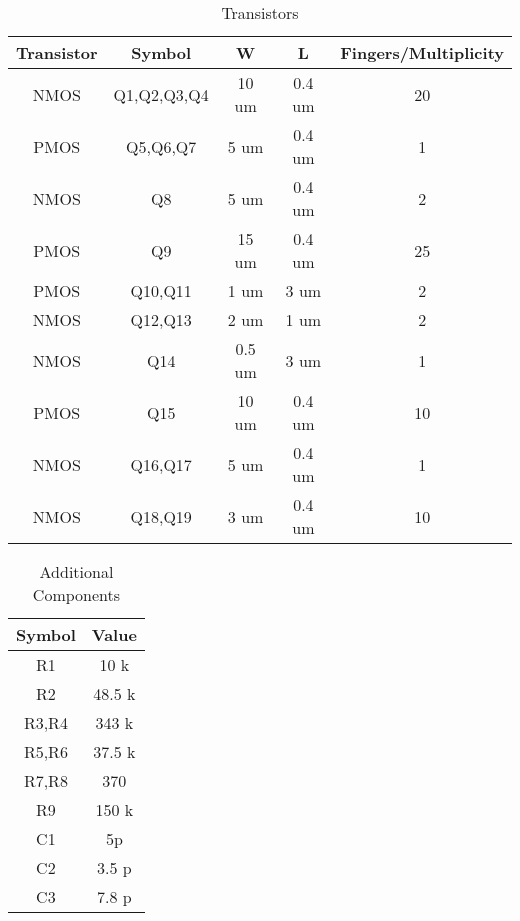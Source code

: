 \begin{table}[h]
\centering
\caption{Transistors}
\label{trans_specs}
\begin{tabular}{c|c|c|c|c}
\textbf{Transistor}  & \textbf{Symbol}& \textbf{W}  & \textbf{L}  & \textbf{Fingers/Multiplicity}  \\ \hline
NMOS                 & Q1,Q2,Q3,Q4    & 10 um       & 0.4 um      & 20                \\
PMOS                 & Q5,Q6,Q7       & 5 um        & 0.4 um      & 1                 \\
NMOS                 & Q8             & 5 um        & 0.4 um      & 2                 \\
PMOS                 & Q9             & 15 um       & 0.4 um      & 25                \\
PMOS                 & Q10,Q11        & 1 um        & 3 um        & 2                 \\
NMOS                 & Q12,Q13        & 2 um        & 1 um        & 2                 \\
NMOS                 & Q14            & 0.5 um      & 3 um        & 1                 \\
PMOS                 & Q15            & 10 um       & 0.4 um      & 10                \\
NMOS                 & Q16,Q17        & 5 um        & 0.4 um      & 1                 \\
NMOS                 & Q18,Q19        & 3 um        & 0.4 um      & 10                \\
\end{tabular}
\end{table}

\begin{table}[h]
\centering
\caption{Additional Components}
\label{res_specs}
\begin{tabular}{c|c}
\textbf{Symbol} & \textbf{Value} \\ \hline
R1              & 10 k           \\
R2              & 48.5 k         \\
R3,R4           & 343 k          \\
R5,R6           & 37.5 k         \\
R7,R8           & 370            \\
R9              & 150 k           \\
C1              & 5p             \\
C2              & 3.5 p          \\
C3              & 7.8 p          \\


\end{tabular}
\end{table}